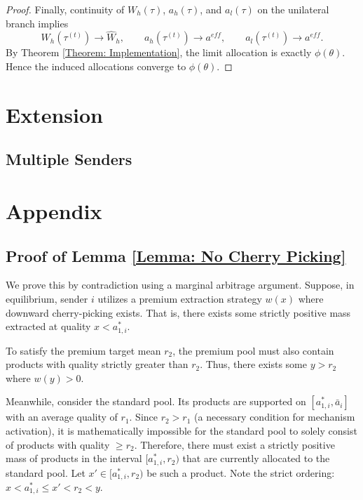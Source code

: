 \documentclass[12pt, a4paper]{article}
\begin{document}
\begin{proof}
    Finally, continuity of $W_h(\tau)$, $a_h(\tau)$, and $a_l(\tau)$ on the unilateral branch implies
    \[
        W_h(\tau^{(t)}) \to \hat{W}_h,
        \qquad
        a_h(\tau^{(t)}) \to a^{eff},
        \qquad
        a_l(\tau^{(t)}) \to a^{eff}.
    \]
    By Theorem \ref{Theorem: Implementation}, the limit allocation is exactly $\phi(\theta)$. Hence the induced allocations converge to $\phi(\theta)$.
\end{proof}


\section{Extension}

\subsection{Multiple Senders}



\section{Appendix}

\subsection*{Proof of Lemma \ref{Lemma: No Cherry Picking}}

    We prove this by contradiction using a marginal arbitrage argument. Suppose, in equilibrium, sender $i$ utilizes a premium extraction strategy $w(x)$ where downward cherry-picking exists. That is, there exists some strictly positive mass extracted at quality $x < a_{1,i}^*$. 
    
    To satisfy the premium target mean $r_2$, the premium pool must also contain products with quality strictly greater than $r_2$. Thus, there exists some $y > r_2$ where $w(y) > 0$.
    
    Meanwhile, consider the standard pool. Its products are supported on $[a_{1,i}^*, \bar{a}_i]$ with an average quality of $r_1$. Since $r_2 > r_1$ (a necessary condition for mechanism activation), it is mathematically impossible for the standard pool to solely consist of products with quality $\ge r_2$. Therefore, there must exist a strictly positive mass of products in the interval $[a_{1,i}^*, r_2)$ that are currently allocated to the standard pool. Let $x' \in [a_{1,i}^*, r_2)$ be such a product. Note the strict ordering: $x < a_{1,i}^* \le x' < r_2 < y$.
\end{document}
